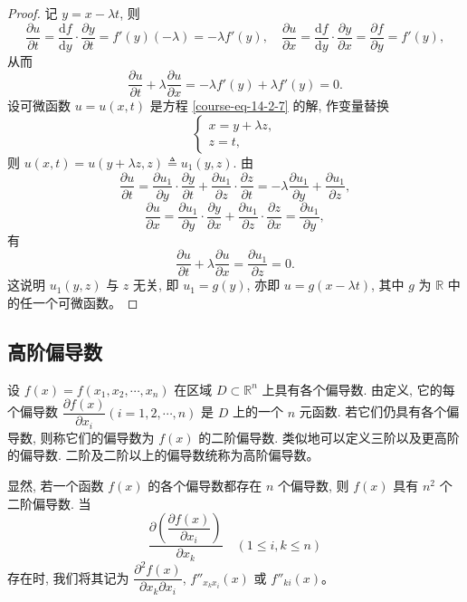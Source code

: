 \documentclass[12pt,fontset=fandol]{ctexart}
\begin{document}
\begin{proof}\quad 记 $y=x-\lambda t$, 则
\[
  \frac{\partial u}{\partial t}
  =\frac{\mathrm df}{\mathrm dy}\cdot\frac{\partial y}{\partial t}
  =f'(y)(-\lambda)=-\lambda f'(y),
  \quad
  \frac{\partial u}{\partial x}
  =\frac{\mathrm df}{\mathrm dy}\cdot\frac{\partial y}{\partial x}
  =\frac{\partial f}{\partial y}=f'(y),
\]
从而
\[
  \frac{\partial u}{\partial t}+\lambda\frac{\partial u}{\partial x}
  =-\lambda f'(y)+\lambda f'(y)=0.
\]
设可微函数 $u=u(x,t)$ 是方程 \eqref{course-eq-14-2-7}  的解, 作变量替换
\[
  \begin{cases}
    x=y+\lambda z,\\
    z=t,
  \end{cases}
\]
则 $u(x,t)=u(y+\lambda z,z)\triangleq u_1(y,z)$. 由
\[
  \frac{\partial u}{\partial t}
  =\frac{\partial u_1}{\partial y}\cdot\frac{\partial y}{\partial t}
  +\frac{\partial u_1}{\partial z}\cdot\frac{\partial z}{\partial t}
  =-\lambda\frac{\partial u_1}{\partial y}
  +\frac{\partial u_1}{\partial z},
\]
\[
  \frac{\partial u}{\partial x}
  =\frac{\partial u_1}{\partial y}\cdot\frac{\partial y}{\partial x}
  +\frac{\partial u_1}{\partial z}\cdot\frac{\partial z}{\partial x}
  =\frac{\partial u_1}{\partial y},
\]
有
\[
  \frac{\partial u}{\partial t}+\lambda\frac{\partial u}{\partial x}
  =\frac{\partial u_1}{\partial z}=0.
\]
这说明 $u_1(y,z)$ 与 $z$ 无关, 即 $u_1=g(y)$, 亦即 $u=g(x-\lambda t)$, 其中 $g$ 为 $\mathbb R$ 中的任一个可微函数。

\end{proof}
\subsection{高阶偏导数}

设 $f(x)=f(x_1,x_2,\cdots,x_n)$ 在区域 $D\subset\mathbb R^n$ 上具有各个偏导数. 由定义, 它的每个偏导数 $\dfrac{\partial f(x)}{\partial x_i}(i=1,2,\cdots,n)$ 是 $D$ 上的一个 $n$ 元函数. 若它们仍具有各个偏导数, 则称它们的偏导数为 $f(x)$ 的二阶偏导数. 类似地可以定义三阶以及更高阶的偏导数. 二阶及二阶以上的偏导数统称为高阶偏导数。

显然, 若一个函数 $f(x)$ 的各个偏导数都存在 $n$ 个偏导数, 则 $f(x)$ 具有 $n^2$ 个二阶偏导数. 当
\[
  \frac{\partial\left(\dfrac{\partial f(x)}{\partial x_i}\right)}{\partial x_k}
  \quad(1\leqslant i,k\leqslant n)
\]
存在时, 我们将其记为 $\dfrac{\partial^2 f(x)}{\partial x_k\partial x_i}$, $f''_{x_kx_i}(x)$ 或 $f''_{ki}(x)$。
\end{document}
